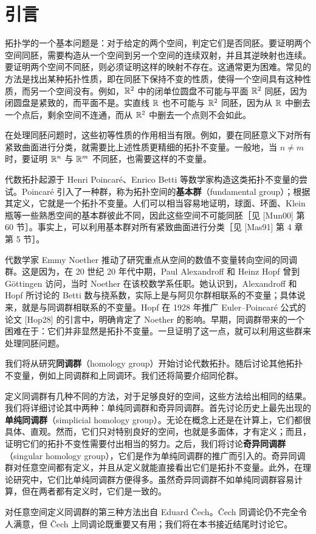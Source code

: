 \section{引言}
拓扑学的一个基本问题是：对于给定的两个空间，判定它们是否同胚。要证明两个空间同胚，需要构造从一个空间到另一个空间的连续双射，并且其逆映射也连续。要证明两个空间不同胚，则必须证明这样的映射不存在。这通常更为困难。常见的方法是找出某种拓扑性质，即在同胚下保持不变的性质，使得一个空间具有这种性质，而另一个空间没有。例如，$\mathbb{R}^2$ 中的闭单位圆盘不可能与平面 $\mathbb{R}^2$ 同胚，因为闭圆盘是紧致的，而平面不是。实直线 $\mathbb{R}$ 也不可能与 $\mathbb{R}^2$ 同胚，因为从 $\mathbb{R}$ 中删去一个点后，剩余空间不连通，而从 $\mathbb{R}^2$ 中删去一个点则不会如此。

在处理同胚问题时，这些初等性质的作用相当有限。例如，要在同胚意义下对所有紧致曲面进行分类，就需要比上述性质更精细的拓扑不变量。一般地，当 $n\ne m$ 时，要证明 $\mathbb{R}^n$ 与 $\mathbb{R}^m$ 不同胚，也需要这样的不变量。

代数拓扑起源于 Henri Poincaré、Enrico Betti 等数学家构造这类拓扑不变量的尝试。Poincaré 引入了一种群，称为拓扑空间的\textbf{基本群}（fundamental group）；根据其定义，它就是一个拓扑不变量。人们可以相当容易地证明，球面、环面、Klein 瓶等一些熟悉空间的基本群彼此不同，因此这些空间不可能同胚［见 [Mun00] 第 60 节］。事实上，可以利用基本群对所有紧致曲面进行分类［见 [Mas91] 第 4 章第 5 节］。

代数学家 Emmy Noether 推动了研究重点从空间的数值不变量转向空间的同调群。这是因为，在 20 世纪 20 年代中期，Paul Alexandroff 和 Heinz Hopf 曾到 Göttingen 访问，当时 Noether 在该校数学系任职。她认识到，Alexandroff 和 Hopf 所讨论的 Betti 数与挠系数，实际上是与阿贝尔群相联系的不变量；具体说来，就是与同调群相联系的不变量。Hopf 在 1928 年推广 Euler--Poincaré 公式的论文 [Hop28] 的引言中，明确肯定了 Noether 的影响。早期，同调群带来的一个困难在于：它们并非显然是拓扑不变量。一旦证明了这一点，就可以利用这些群来处理同胚问题。

我们将从研究\textbf{同调群}（homology group）开始讨论代数拓扑。随后讨论其他拓扑不变量，例如上同调群和上同调环。我们还将简要介绍同伦群。

定义同调群有几种不同的方法，对于足够良好的空间，这些方法给出相同的结果。我们将详细讨论其中两种：单纯同调群和奇异同调群。首先讨论历史上最先出现的\textbf{单纯同调群}（simplicial homology group）。无论在概念上还是在计算上，它们都很具体、直观。然而，它们只对特别良好的空间，也就是多面体，才有定义；而且，证明它们的拓扑不变性需要付出相当的努力。之后，我们将讨论\textbf{奇异同调群}（singular homology group），它们是作为单纯同调群的推广而引入的。奇异同调群对任意空间都有定义，并且从定义就能直接看出它们是拓扑不变量。此外，在理论研究中，它们比单纯同调群方便得多。虽然奇异同调群不如单纯同调群容易计算，但在两者都有定义时，它们是一致的。

对任意空间定义同调群的第三种方法出自 Eduard Čech。Čech 同调论仍不完全令人满意，但 Čech 上同调论既重要又有用；我们将在本书接近结尾时讨论它。
